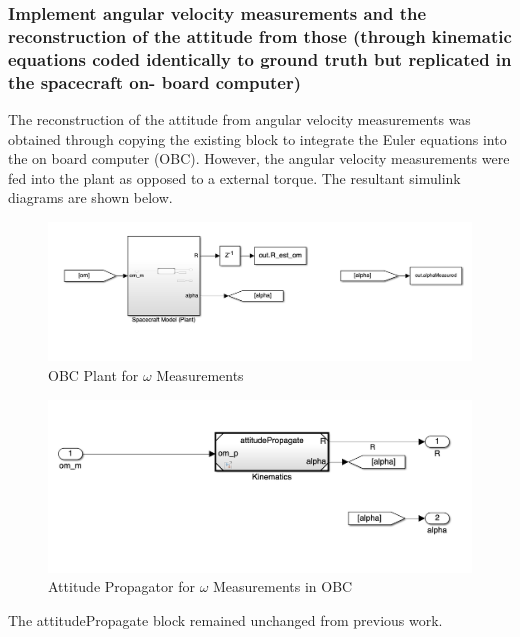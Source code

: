 \subsubsection{Implement angular velocity measurements and the reconstruction of the attitude from those (through kinematic equations coded identically to ground truth but replicated in the spacecraft on- board computer)}

The reconstruction of the attitude from angular velocity measurements was obtained through copying the existing block to integrate the Euler equations into the on board computer (OBC). However, the angular velocity measurements were fed into the plant as opposed to a external torque. The resultant simulink diagrams are shown below.

\begin{figure}[H]
    \centering
    \captionsetup{ justification = centering }
    \includegraphics[width = 15cm]{Images/PS6/obc_plant_om.png}
    \caption{OBC Plant for $\omega$ Measurements}
    \label{fig:obc_plant_omega}
\end{figure}

\begin{figure}[H]
    \centering
    \captionsetup{ justification = centering }
    \includegraphics[width = 15cm]{Images/PS6/obc_attitudeProp_om.png}
    \caption{Attitude Propagator for $\omega$ Measurements in OBC}
    \label{fig:obc_prop_omega}
\end{figure}

The attitudePropagate block remained unchanged from previous work.

